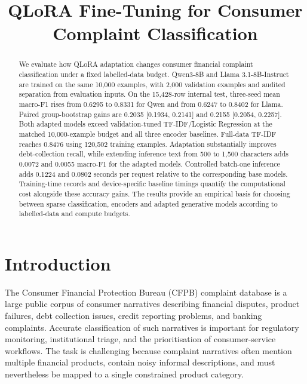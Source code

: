\documentclass{elektr}
\title{QLoRA Fine-Tuning for Consumer Complaint Classification}
\author[Manuscript]{
\rec{}
\acc{}
\finv{}
}
\begin{document}
\maketitle
\begin{abstract}
We evaluate how QLoRA adaptation changes consumer financial complaint classification under a fixed labelled-data budget. Qwen3-8B and Llama 3.1-8B-Instruct are trained on the same 10,000 examples, with 2,000 validation examples and audited separation from evaluation inputs. On the 15,428-row internal test, three-seed mean macro-F1 rises from 0.6295 to 0.8331 for Qwen and from 0.6247 to 0.8402 for Llama. Paired group-bootstrap gains are 0.2035 [0.1934, 0.2141] and 0.2155 [0.2054, 0.2257]. Both adapted models exceed validation-tuned TF-IDF/Logistic Regression at the matched 10,000-example budget and all three encoder baselines. Full-data TF-IDF reaches 0.8476 using 120,502 training examples. Adaptation substantially improves debt-collection recall, while extending inference text from 500 to 1,500 characters adds 0.0072 and 0.0055 macro-F1 for the adapted models. Controlled batch-one inference adds 0.1224 and 0.0802 seconds per request relative to the corresponding base models. Training-time records and device-specific baseline timings quantify the computational cost alongside these accuracy gains. The results provide an empirical basis for choosing between sparse classification, encoders and adapted generative models according to labelled-data and compute budgets.
\end{abstract}

\section{Introduction}
The Consumer Financial Protection Bureau (CFPB) complaint database is a large public corpus of consumer narratives describing financial disputes, product failures, debt collection issues, credit reporting problems, and banking complaints. Accurate classification of such narratives is important for regulatory monitoring, institutional triage, and the prioritisation of consumer-service workflows. The task is challenging because complaint narratives often mention multiple financial products, contain noisy informal descriptions, and must nevertheless be mapped to a single constrained product category.
\end{document}

